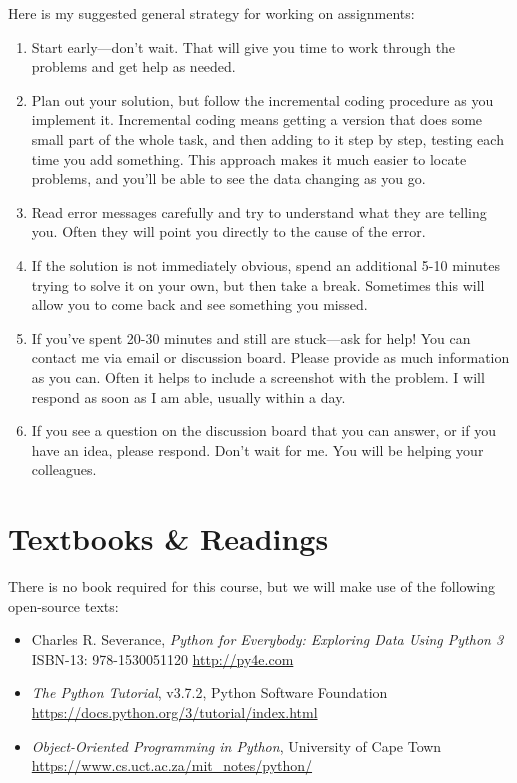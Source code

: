 \documentclass[11pt]{article}
\begin{document}
Here is my suggested general strategy for working on assignments:
\begin{enumerate}
	\item Start early---don't wait. That will give you time to work through the problems and get help as needed.
	\item Plan out your solution, but follow the incremental coding procedure as you implement it.  Incremental coding means getting a version that does some small part of the whole task, and then adding to it step by step, testing each time you add something. This approach makes it much easier to locate problems, and you'll be able to see the data changing as you go.
	\item Read error messages carefully and try to understand what they are telling you. Often they will point you directly to the cause of the error.
	\item If the solution is not immediately obvious, spend an additional 5-10 minutes trying to solve it on your own, but then take a break. Sometimes this will allow you to come back and see something you missed.
	\item If you’ve spent 20-30 minutes and still are stuck---ask for help! You can contact me via email or discussion board. Please provide as much information as you can. Often it helps to include a screenshot with the problem. I will respond as soon as I am able, usually within a day.
	\item If you see a question on the discussion board that you can answer, or if you have an idea, please respond. Don’t wait for me. You will be helping your colleagues.
\end{enumerate}

\section{Textbooks \& Readings}
There is no book required for this course, but we will make use of the following open-source texts:
\begin{itemize}
	\item Charles R. Severance, \textit{Python for Everybody: Exploring Data Using Python 3} ISBN-13: 978-1530051120 \url{http://py4e.com}
	\item \textit{The Python Tutorial}, v3.7.2, Python Software Foundation \url{https://docs.python.org/3/tutorial/index.html}
	\item \textit{Object-Oriented Programming in Python}, University of Cape Town \url{https://www.cs.uct.ac.za/mit_notes/python/}
\end{itemize}
\end{document}
